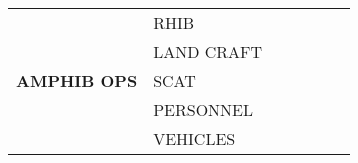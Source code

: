 \documentclass[a4paper,landscape,final,8pt]{beamer} %
\begin{document}
\begin{textblock*}{25cm}
{\begin{tabular}{|p{2.8cm}|p{3.4cm}|c|c|c|c|c|}
\multirow{5}{*}{\cellcolor{gray!20}\textbf{AMPHIB OPS}}
 & RHIB
 & \cellcolor{\csname RHIBa06a1aC\endcsname}{\csname RHIBa06a1aT\endcsname}
 & \cellcolor{\csname RHIBa12aC\endcsname}{\csname RHIBa12aT\endcsname}
 & \cellcolor{\csname RHIBa18aC\endcsname}{\csname RHIBa18aT\endcsname}
 & \cellcolor{\csname RHIBa00aC\endcsname}{\csname RHIBa00aT\endcsname}
 & \cellcolor{\csname RHIBa06a2aC\endcsname}{\csname RHIBa06a2aT\endcsname} \\
\hhline{|~|-|-|-|-|-|-|}  %
 & LAND CRAFT
 & \cellcolor{\csname LNDa06a1aC\endcsname}{\csname LNDa06a1aT\endcsname}
 & \cellcolor{\csname LNDa12aC\endcsname}{\csname LNDa12aT\endcsname}
 & \cellcolor{\csname LNDa18aC\endcsname}{\csname LNDa18aT\endcsname}
 & \cellcolor{\csname LNDa00aC\endcsname}{\csname LNDa00aT\endcsname}
 & \cellcolor{\csname LNDa06a2aC\endcsname}{\csname LNDa06a2aT\endcsname} \\
\hhline{|~|-|-|-|-|-|-|}  %
 & SCAT
 & \cellcolor{\csname SCATa06a1aC\endcsname}{\csname SCATa06a1aT\endcsname}
 & \cellcolor{\csname SCATa12aC\endcsname}{\csname SCATa12aT\endcsname}
 & \cellcolor{\csname SCATa18aC\endcsname}{\csname SCATa18aT\endcsname}
 & \cellcolor{\csname SCATa00aC\endcsname}{\csname SCATa00aT\endcsname}
 & \cellcolor{\csname SCATa06a2aC\endcsname}{\csname SCATa06a2aT\endcsname} \\
\hhline{|~|-|-|-|-|-|-|}  %
 & PERSONNEL
 & \cellcolor{\csname PERSONNELa06a1aC\endcsname}{\csname PERSONNELa06a1aT\endcsname}
 & \cellcolor{\csname PERSONNELa12aC\endcsname}{\csname PERSONNELa12aT\endcsname}
 & \cellcolor{\csname PERSONNELa18aC\endcsname}{\csname PERSONNELa18aT\endcsname}
 & \cellcolor{\csname PERSONNELa00aC\endcsname}{\csname PERSONNELa00aT\endcsname}
 & \cellcolor{\csname PERSONNELa06a2aC\endcsname}{\csname PERSONNELa06a2aT\endcsname} \\
\hhline{|~|-|-|-|-|-|-|}  %
 & VEHICLES
 & \cellcolor{\csname VEHICLESa06a1aC\endcsname}{\csname VEHICLESa06a1aT\endcsname}
 & \cellcolor{\csname VEHICLESa12aC\endcsname}{\csname VEHICLESa12aT\endcsname}
 & \cellcolor{\csname VEHICLESa18aC\endcsname}{\csname VEHICLESa18aT\endcsname}
 & \cellcolor{\csname VEHICLESa00aC\endcsname}{\csname VEHICLESa00aT\endcsname}
 & \cellcolor{\csname VEHICLESa06a2aC\endcsname}{\csname VEHICLESa06a2aT\endcsname} \\
\hline


\end{tabular}}
\end{textblock*}
\end{document}
